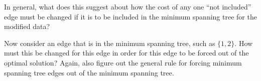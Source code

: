 \documentclass[fullpage,fleqn,leqno]{article}
\begin{document}
\vspace*{6\baselineskip}


In general, what does this suggest about how the cost of any one ``not
included'' edge must be changed if it is to be included in the minimum
spanning tree for the modified data?

\vspace*{8\baselineskip}


Now consider an edge that is in the minimum spanning tree, such as
$\{1, 2\}$. How must this be changed for this edge in order for this
edge to be forced out of the optimal solution? Again, also figure out
the general rule for forcing minimum spanning tree edges out of the
minimum spanning tree.

  
\end{document}
